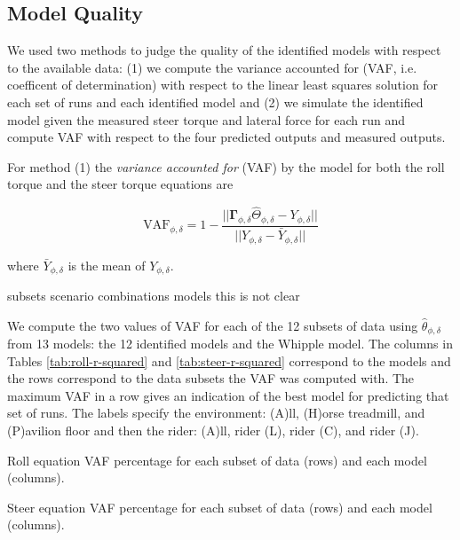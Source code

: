 \documentclass[a4paper]{article}
\begin{document}
\subsection*{Model Quality}

We used two methods to judge the quality of the identified models with respect
to the available data: (1) we compute the variance accounted for (VAF, i.e.
coefficent of determination) with respect to the linear least squares solution
for each set of runs and each identified model and (2) we simulate the
identified model given the measured steer torque and lateral force for each run
and compute VAF with respect to the four predicted outputs and measured
outputs.

For method (1) the \emph{variance accounted for} (VAF) by the model for both
the roll torque and the steer torque equations are

\begin{equation}
  \label{eq:vaf}
  \textrm{VAF}_{\phi,\delta} = 1 - \frac{\vert \vert
    \mathbf{\Gamma}_{\phi,\delta}\hat{\Theta}_{\phi,\delta} - Y_{\phi,\delta} \vert \vert}
                            {\vert \vert Y_{\phi,\delta} - \bar{Y}_{\phi,\delta} \vert \vert}
\end{equation}

where $\bar{Y}_{\phi,\delta}$ is the mean of $Y_{\phi,\delta}$.

subsets scenario  combinations  models   this is not clear

We compute the two values of VAF for each of the 12 subsets of data using
$\hat{\theta}_{\phi,\delta}$ from 13 models: the 12 identified models and the
Whipple model. The columns in Tables \ref{tab:roll-r-squared} and
\ref{tab:steer-r-squared} correspond to the models and the rows correspond to
the data subsets the VAF was computed with. The maximum VAF in a row gives an
indication of the best model for predicting that set of runs. The labels
specify the environment: (A)ll, (H)orse treadmill, and (P)avilion floor and
then the rider: (A)ll, rider (L), rider (C), and rider (J).

\begin{table}
  \centering
  \caption{Roll equation VAF percentage for each subset of data (rows) and each
    model (columns).}
  \tiny
  
  \label{tab:roll-r-squared}
\end{table}

\begin{table}
  \centering
  \caption{Steer equation VAF percentage for each subset of data (rows) and
    each model (columns).}
  \label{tab:steer-r-squared}
  \tiny
  
\end{table}
\end{document}
